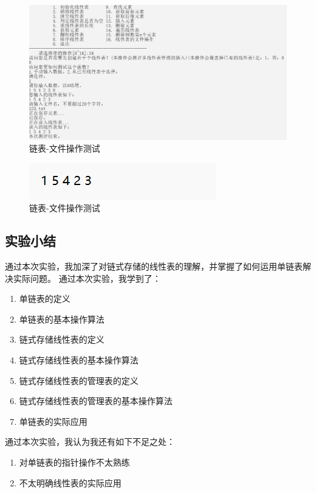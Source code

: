 \documentclass[supercite]{Experimental_Report}
\theoremstyle{definition}
\begin{document}
\begin{enumerate}
\begin{figure}[htb]
			\begin{center}
				\includegraphics[scale=0.60]{images/链表-文件操作.png}
				\caption{链表-文件操作测试}
				\label{fig1-18.1}
			\end{center}
		\end{figure}
		\begin{figure}[htb]
			\begin{center}
				\includegraphics[scale=2.50]{images/链表-文件.png}
				\caption{链表-文件操作测试}
				\label{fig1-18.2}
			\end{center}
		\end{figure}
		\newpage
	\end{enumerate}

\subsection{实验小结}
通过本次实验，我加深了对链式存储的线性表的理解，并掌握了如何运用单链表解决实际问题。
通过本次实验，我学到了：
\begin{enumerate}
	\item 单链表的定义
    \item 单链表的基本操作算法
	\item 链式存储线性表的定义
    \item 链式存储线性表的基本操作算法
    \item 链式存储线性表的管理表的定义
    \item 链式存储线性表的管理表的基本操作算法
    \item 单链表的实际应用
\end{enumerate}
通过本次实验，我认为我还有如下不足之处：
\begin{enumerate}
	\item 对单链表的指针操作不太熟练
    \item 不太明确线性表的实际应用
\end{enumerate}
\newpage
\end{document}

